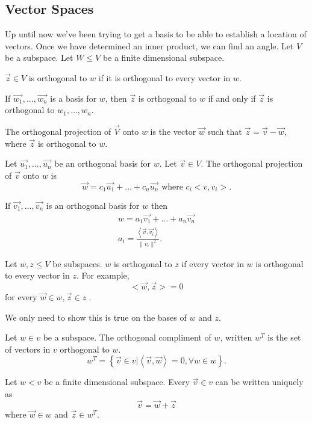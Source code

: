 \subsection{Vector Spaces}
Up until now we've been trying to get a basis to be able to establish a location of vectors. Once we have determined an inner product, we can find an angle. Let $V$ be a subspace. Let $W \le V$ be a finite dimensional subspace.
\begin{definition}
  $\vec{z}\in V$ is orthogonal to $w$ if it is orthogonal to every vector in $w$.
\end{definition}
\begin{note}
  If $\vec{w_1},\ldots,\vec{w_n}$ is a basis for $w$, then $\vec{z}$ is orthogonal to $w$ if and only if $\vec{z}$ is orthogonal to $w_1,\ldots,w_n$.
\end{note}
\begin{definition}
  The orthogonal projection of $\vec{V}$ onto $w$ is the vector $\vec{w}$ such that $\vec{z}=\vec{v}-\vec{w}$, where $\vec{z}$ is orthogonal to $w$.
\end{definition}
\begin{theorem}
  Let $\vec{u_1},\ldots,\vec{u_n}$ be an orthogonal basis for $w$. Let $\vec{v}\in V$. The orthogonal projection of $\vec{v}$ onto $w$ is 
  \[
    \vec{w}=c_1\vec{u_1}+\ldots+c_n \vec{u_n}\text{ where $c_i<v,v_i>$}
  .\] 
\end{theorem}
\begin{note}
  If $\vec{v_1},\ldots,\vec{v_n}$ is an orthogonal basis for $w$ then 
  \begin{align*}
    w=a_1\vec{v_1}+\ldots+a_n \vec{v_n}\\
    a_i=\frac{\left<\vec{v},\vec{v_i} \right>}{\|v_i\|^2}
  .\end{align*}
\end{note}
\begin{definition}
  Let $w,z\le V$ be subspaces. $w$ is orthogonal to $z$ if every vector in $w$ is orthogonal to every vector in $z$. For example,
    \[
    <\vec{w},\vec{z}> = 0
    \] 
   for every $\vec{w}\in w, \vec{z}\in z$ .
\end{definition}
\begin{note}
  We only need to show this is true on the bases of $w$ and $z$.
\end{note}
\begin{definition}
  Let $w\in v$ be a subspace. The orthogonal compliment of $w$, written $w^{T}$ is the set of vectors in $v$ orthogonal to $w$.
  \[
  w^{T}=\left\{ \vec{v}\in v | \left<\vec{v},\vec{w} \right> =0, \forall w\in w \right\} 
  .\] 
\end{definition}
\begin{theorem}
  Let $w<v$ be a finite dimensional subspace. Every $\vec{v}\in v$ can be written uniquely as 
  \[
  \vec{v}=\vec{w}+\vec{z}
  \] 
  where $\vec{w}\in w$ and $\vec{z}\in w^{T}$.
\end{theorem}
